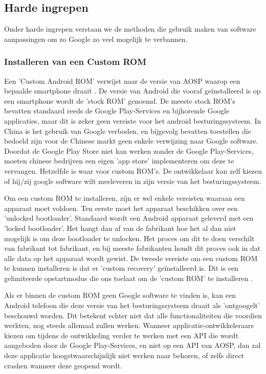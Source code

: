 \subsection{Harde ingrepen}

Onder harde ingrepen verstaan we de methoden die gebruik maken van software aanpassingen om zo Google zo veel mogelijk te verbannen.

\subsubsection{Installeren van een Custom ROM}
Een 'Custom Android ROM' verwijst naar de versie van AOSP waarop een bepaalde smartphone draait \autocite{custom-rom}. De versie van Android die vooraf geïnstalleerd is op een smartphone wordt de 'stock ROM' genoemd. De meeste stock ROM's bevatten standaard reeds de Google Play-Services en bijhorende Google applicaties, maar dit is zeker geen vereiste voor het android besturingssysteem. In China is het gebruik van Google verboden, en bijgevolg bevatten toestellen die bedoeld zijn voor de Chinese markt geen enkele verwijzing naar Google software. Doordat de Google Play Store niet kan werken zonder de Google Play-Services, moeten chinese bedrijven een eigen 'app store' implementeren om deze te vervangen. Hetzelfde is waar voor custom ROM's. De ontwikkelaar kan zelf kiezen of hij/zij google software wilt meeleveren in zijn versie van het besturingssysteem.

Om een custom ROM te installeren, zijn er wel enkele vereisten waaraan een apparaat moet voldoen. Ten eerste moet het apparaat beschikken over een 'unlocked bootloader'. Standaard wordt een Android apparaat geleverd met een 'locked bootloader'. Het hangt dan af van de fabrikant hoe het al dan niet mogelijk is om deze bootloader te unlocken. Het proces om dit te doen verschilt van fabrikant tot fabrikant, en bij meeste fabrikanten houdt dit proces ook in dat alle data op het apparaat wordt gewist. De tweede vereiste om een custom ROM te kunnen installeren is dat er 'custom recovery' geïnstalleerd is. Dit is een gelimiteerde opstartmodus die ons toelaat om de 'custom ROM' te installeren \autocite{hoffman_custom-recovery}.

Als er binnen de custom ROM geen Google software te vinden is, kan een Android telefoon die deze versie van het besturingssysteem draait als 'ontgoogelt' beschouwd worden. Dit betekent echter niet dat alle functionaliteiten die voordien werkten, nog steeds allemaal zullen werken. Wanneer applicatie-ontwikkeleraars kiezen om tijdens de ontwikkeling verder te werken met een API die wordt aangeboden door de Google Play-Services, en niet op een API van AOSP, dan zal deze applicatie hoogstwaarschijnlijk niet werken naar behoren, of zelfs direct crashen wanneer deze geopend wordt.


